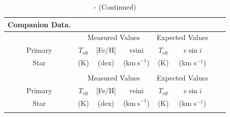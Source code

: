 \begin{scriptsize}
\begin{longtable}{cccc}
\end{longtable}
\end{scriptsize}






\begin{scriptsize}
\begin{longtable}{cccccccc}
    
    \caption{Companion Data.\\ \label{paper5_tab:measured}}
    \\ \hline
     &  \multicolumn{3}{c}{Measured Values} &  \multicolumn{2}{c}{Expected Values} \\
Primary &  $T_\mathrm{eff}$ & [Fe/H] & vsini & $T_\mathrm{eff}$ &  $v\sin{i}$ \\
Star & (K) & (dex) & ($\mathrm{km\ s}^{-1}$) & (K) & (km s$^{-1}$) \\ \hline
    \endfirsthead

    \caption{ - (Continued)}
    \\ \hline
     &  \multicolumn{3}{c}{Measured Values} &  \multicolumn{2}{c}{Expected Values} \\
Primary &  $T_\mathrm{eff}$ & [Fe/H] & vsini & $T_\mathrm{eff}$ &  $v\sin{i}$ \\
Star & (K) & (dex) & ($\mathrm{km\ s}^{-1}$) & (K) & (km s$^{-1}$) \\ \hline
    \endhead

    \hline
    \endfoot

    \hline
    \endlastfoot





\end{longtable}
\end{scriptsize}
